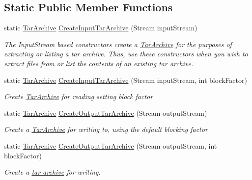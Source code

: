 \subsection*{Static Public Member Functions}
\begin{DoxyCompactItemize}
\item 
static \hyperlink{class_i_c_sharp_code_1_1_sharp_zip_lib_1_1_tar_1_1_tar_archive}{Tar\+Archive} \hyperlink{class_i_c_sharp_code_1_1_sharp_zip_lib_1_1_tar_1_1_tar_archive_aed597bbb48f7ca7567cebbf63d149c2b}{Create\+Input\+Tar\+Archive} (Stream input\+Stream)
\begin{DoxyCompactList}\small\item\em The Input\+Stream based constructors create a \hyperlink{class_i_c_sharp_code_1_1_sharp_zip_lib_1_1_tar_1_1_tar_archive}{Tar\+Archive} for the purposes of extracting or listing a tar archive. Thus, use these constructors when you wish to extract files from or list the contents of an existing tar archive. \end{DoxyCompactList}\item 
static \hyperlink{class_i_c_sharp_code_1_1_sharp_zip_lib_1_1_tar_1_1_tar_archive}{Tar\+Archive} \hyperlink{class_i_c_sharp_code_1_1_sharp_zip_lib_1_1_tar_1_1_tar_archive_afc90896556a6bde9e0117935a8749ec1}{Create\+Input\+Tar\+Archive} (Stream input\+Stream, int block\+Factor)
\begin{DoxyCompactList}\small\item\em Create \hyperlink{class_i_c_sharp_code_1_1_sharp_zip_lib_1_1_tar_1_1_tar_archive}{Tar\+Archive} for reading setting block factor \end{DoxyCompactList}\item 
static \hyperlink{class_i_c_sharp_code_1_1_sharp_zip_lib_1_1_tar_1_1_tar_archive}{Tar\+Archive} \hyperlink{class_i_c_sharp_code_1_1_sharp_zip_lib_1_1_tar_1_1_tar_archive_a7dbd5d874623ea87aa9c42af63f4f874}{Create\+Output\+Tar\+Archive} (Stream output\+Stream)
\begin{DoxyCompactList}\small\item\em Create a \hyperlink{class_i_c_sharp_code_1_1_sharp_zip_lib_1_1_tar_1_1_tar_archive}{Tar\+Archive} for writing to, using the default blocking factor \end{DoxyCompactList}\item 
static \hyperlink{class_i_c_sharp_code_1_1_sharp_zip_lib_1_1_tar_1_1_tar_archive}{Tar\+Archive} \hyperlink{class_i_c_sharp_code_1_1_sharp_zip_lib_1_1_tar_1_1_tar_archive_ac3bc486e99de8a492986280c40f0c04b}{Create\+Output\+Tar\+Archive} (Stream output\+Stream, int block\+Factor)
\begin{DoxyCompactList}\small\item\em Create a \hyperlink{class_i_c_sharp_code_1_1_sharp_zip_lib_1_1_tar_1_1_tar_archive}{tar archive} for writing. \end{DoxyCompactList}\end{DoxyCompactItemize}
